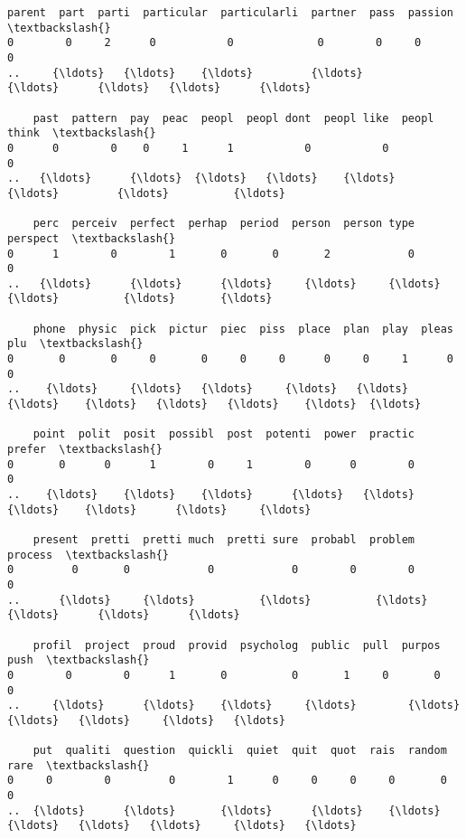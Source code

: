 \documentclass[11pt]{article}
\begin{document}
\begin{Verbatim}[commandchars=\\\{\}]
    parent  part  parti  particular  particularli  partner  pass  passion  \textbackslash{}
0        0     2      0           0             0        0     0        0   
..     {\ldots}   {\ldots}    {\ldots}         {\ldots}           {\ldots}      {\ldots}   {\ldots}      {\ldots}   

    past  pattern  pay  peac  peopl  peopl dont  peopl like  peopl think  \textbackslash{}
0      0        0    0     1      1           0           0            0   
..   {\ldots}      {\ldots}  {\ldots}   {\ldots}    {\ldots}         {\ldots}         {\ldots}          {\ldots}   

    perc  perceiv  perfect  perhap  period  person  person type  perspect  \textbackslash{}
0      1        0        1       0       0       2            0         0   
..   {\ldots}      {\ldots}      {\ldots}     {\ldots}     {\ldots}     {\ldots}          {\ldots}       {\ldots}   

    phone  physic  pick  pictur  piec  piss  place  plan  play  pleas  plu  \textbackslash{}
0       0       0     0       0     0     0      0     0     1      0    0   
..    {\ldots}     {\ldots}   {\ldots}     {\ldots}   {\ldots}   {\ldots}    {\ldots}   {\ldots}   {\ldots}    {\ldots}  {\ldots}   

    point  polit  posit  possibl  post  potenti  power  practic  prefer  \textbackslash{}
0       0      0      1        0     1        0      0        0       0   
..    {\ldots}    {\ldots}    {\ldots}      {\ldots}   {\ldots}      {\ldots}    {\ldots}      {\ldots}     {\ldots}   

    present  pretti  pretti much  pretti sure  probabl  problem  process  \textbackslash{}
0         0       0            0            0        0        0        0   
..      {\ldots}     {\ldots}          {\ldots}          {\ldots}      {\ldots}      {\ldots}      {\ldots}   

    profil  project  proud  provid  psycholog  public  pull  purpos  push  \textbackslash{}
0        0        0      1       0          0       1     0       0     0   
..     {\ldots}      {\ldots}    {\ldots}     {\ldots}        {\ldots}     {\ldots}   {\ldots}     {\ldots}   {\ldots}   

    put  qualiti  question  quickli  quiet  quit  quot  rais  random  rare  \textbackslash{}
0     0        0         0        1      0     0     0     0       0     0   
..  {\ldots}      {\ldots}       {\ldots}      {\ldots}    {\ldots}   {\ldots}   {\ldots}   {\ldots}     {\ldots}   {\ldots}   


\end{Verbatim}
\end{document}
